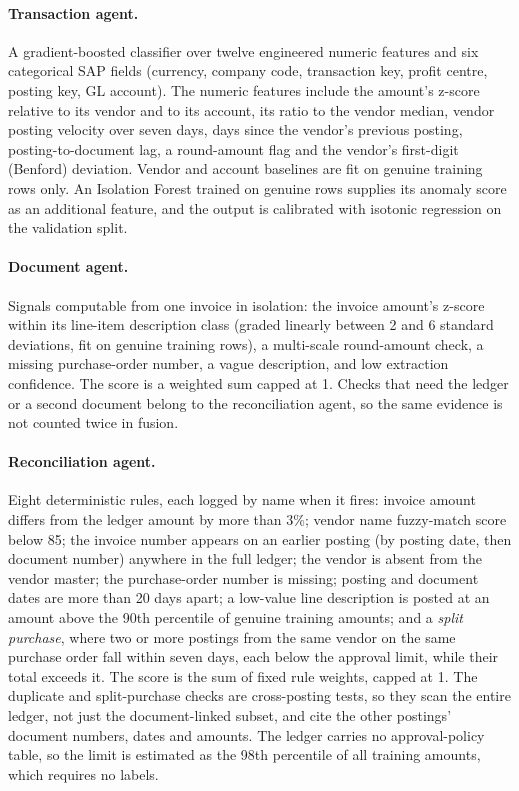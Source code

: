 \documentclass{article}
\begin{document}
\paragraph{Transaction agent.} A gradient-boosted classifier \citep{chen2016xgboost} over twelve engineered numeric features and six categorical SAP fields (currency, company code, transaction key, profit centre, posting key, GL account). The numeric features include the amount's z-score relative to its vendor and to its account, its ratio to the vendor median, vendor posting velocity over seven days, days since the vendor's previous posting, posting-to-document lag, a round-amount flag and the vendor's first-digit (Benford) deviation. Vendor and account baselines are fit on genuine training rows only. An Isolation Forest \citep{liu2008isolation} trained on genuine rows supplies its anomaly score as an additional feature, and the output is calibrated with isotonic regression on the validation split.

\paragraph{Document agent.} Signals computable from one invoice in isolation: the invoice amount's z-score within its line-item description class (graded linearly between 2 and 6 standard deviations, fit on genuine training rows), a multi-scale round-amount check, a missing purchase-order number, a vague description, and low extraction confidence. The score is a weighted sum capped at 1. Checks that need the ledger or a second document belong to the reconciliation agent, so the same evidence is not counted twice in fusion.

\paragraph{Reconciliation agent.} Eight deterministic rules, each logged by name when it fires: invoice amount differs from the ledger amount by more than 3\%; vendor name fuzzy-match score below 85; the invoice number appears on an earlier posting (by posting date, then document number) anywhere in the full ledger; the vendor is absent from the vendor master; the purchase-order number is missing; posting and document dates are more than 20 days apart; a low-value line description is posted at an amount above the 90th percentile of genuine training amounts; and a \emph{split purchase}, where two or more postings from the same vendor on the same purchase order fall within seven days, each below the approval limit, while their total exceeds it. The score is the sum of fixed rule weights, capped at 1. The duplicate and split-purchase checks are cross-posting tests, so they scan the entire ledger, not just the document-linked subset, and cite the other postings' document numbers, dates and amounts. The ledger carries no approval-policy table, so the limit is estimated as the 98th percentile of all training amounts, which requires no labels.
\end{document}
